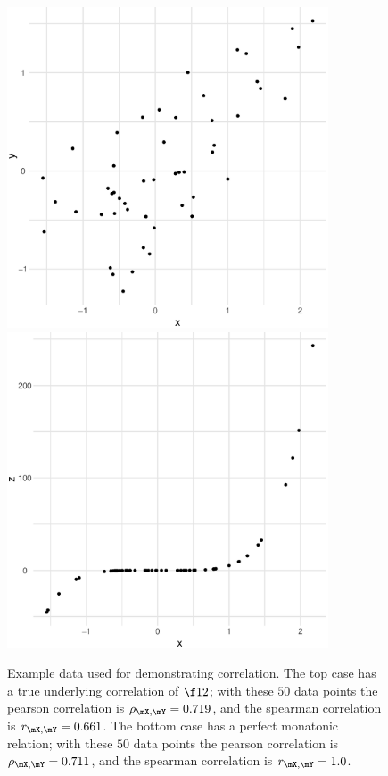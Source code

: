 \documentclass[../primer.tex]{subfiles}
\begin{document}
\begin{figure}[!ht]
  \centering
  \includegraphics[width=0.85\textwidth]{./images/corr_xy}\\
  \includegraphics[width=0.85\textwidth]{./images/corr_xz}

  \caption{Example data used for demonstrating correlation. The top case has a
    true underlying correlation of $\f12$; with these $50$ data points the
    pearson correlation is $\rho_{\mX,\mY} = 0.719$, and the spearman
    correlation is $r_{\mX,\mY} = 0.661$. The bottom case has a perfect
    monatonic relation; with these $50$ data points the pearson correlation is
    $\rho_{\mX,\mY} = 0.711$, and the spearman correlation is $r_{\mX,\mY} =
    1.0$.}
\end{figure}
\end{document}
